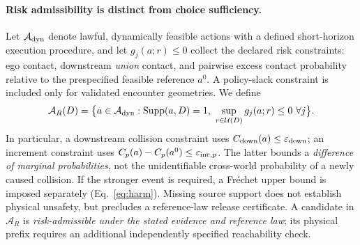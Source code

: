 \documentclass[10pt]{article}
\begin{document}
\paragraph{Risk admissibility is distinct from choice sufficiency.}
Let $\mathcal A_{\rm dyn}$ denote lawful, dynamically feasible actions with a defined short-horizon execution procedure, and let $g_j(a;r)\le0$ collect the declared risk constraints: ego contact, downstream \emph{union} contact, and pairwise excess contact probability relative to the prespecified feasible reference $a^0$. A policy-slack constraint is included only for validated encounter geometries. We define
\begin{equation}
 \mathcal A_R(D)=\bigl\{a\in\mathcal A_{\rm dyn}:\operatorname{Supp}(a,D)=1,
 \ \sup_{r\in\mathcal U(D)}g_j(a;r)\le0\ \forall j\bigr\}.
 \label{eq:robustgate}
\end{equation}
In particular, a downstream collision constraint uses $C_{\rm down}(a)\le\varepsilon_{\rm down}$; an increment constraint uses $C_p(a)-C_p(a^0)\le\varepsilon_{{\rm inc},p}$. The latter bounds a \emph{difference of marginal probabilities}, not the unidentifiable cross-world probability of a newly caused collision. If the stronger event is required, a Fr\'echet upper bound is imposed separately (Eq.~\eqref{eq:harm}). Missing source support does not establish physical unsafety, but precludes a reference-law release certificate. A candidate in $\mathcal A_R$ is \emph{risk-admissible under the stated evidence and reference law}; its physical prefix requires an additional independently specified reachability check.
\end{document}
